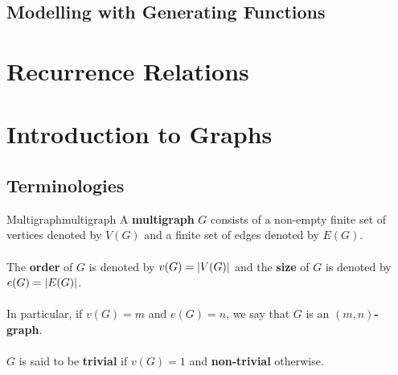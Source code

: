 \documentclass[math]{amznotes}
\theoremstyle{remark}
\begin{document}
\section{Modelling with Generating Functions}

\chapter{Recurrence Relations}

\chapter{Introduction to Graphs}
\section{Terminologies}
\begin{dfnbox}{Multigraph}{multigraph}
    A {\color{red} \textbf{multigraph}} $G$ consists of a non-empty finite set of vertices denoted by $V(G)$ and a finite set of edges denoted by $E(G)$.
    \\\\
    The {\color{red} \textbf{order}} of $G$ is denoted by $v(G) = {\left\lvert {V(G)} \right\rvert}$ and the {\color{red} \textbf{size}} of $G$ is denoted by $e(G) = {\left\lvert {E(G)} \right\rvert}$.
    \\\\
    In particular, if $v(G) = m$ and $e(G) = n$, we say that $G$ is an {\color{red} \textbf{$(m, n)$-graph}}.
    \\\\
    $G$ is said to be {\color{red} \textbf{trivial}} if $v(G) = 1$ and {\color{red} \textbf{non-trivial}} otherwise.
\end{dfnbox}
\end{document}
